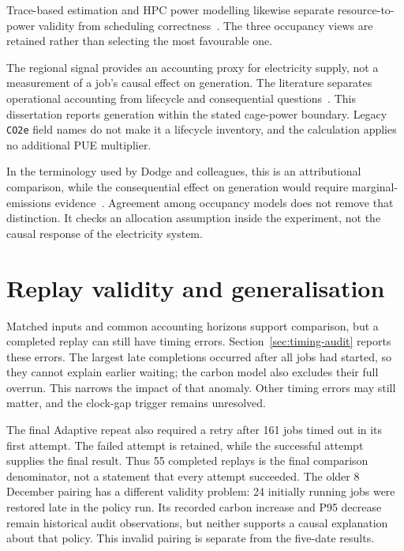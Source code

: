 Trace-based estimation and HPC power modelling likewise separate resource-to-power validity from scheduling correctness~\cite{west2024ichnos,obrien2017survey}. The three occupancy views are retained rather than selecting the most favourable one.

The regional signal provides an accounting proxy for electricity supply, not a measurement of a job's causal effect on generation. The literature separates operational accounting from lifecycle and consequential questions~\cite{lannelongue2021green,gupta2022act,sukprasert2024limitations}. This dissertation reports generation \co{} within the stated cage-power boundary. Legacy \texttt{CO2e} field names do not make it a lifecycle inventory, and the calculation applies no additional PUE multiplier.

In the terminology used by Dodge and colleagues, this is an attributional comparison, while the consequential effect on generation would require marginal-emissions evidence~\cite{dodge2022carbon}. Agreement among occupancy models does not remove that distinction. It checks an allocation assumption inside the experiment, not the causal response of the electricity system.

\section{Replay validity and generalisation}
Matched inputs and common accounting horizons support comparison, but a completed replay can still have timing errors. Section~\ref{sec:timing-audit} reports these errors. The largest late completions occurred after all jobs had started, so they cannot explain earlier waiting; the carbon model also excludes their full overrun. This narrows the impact of that anomaly. Other timing errors may still matter, and the clock-gap trigger remains unresolved.

The final Adaptive repeat also required a retry after 161 jobs timed out in its first attempt. The failed attempt is retained, while the successful attempt supplies the final result. Thus 55 completed replays is the final comparison denominator, not a statement that every attempt succeeded. The older 8 December pairing has a different validity problem: 24 initially running jobs were restored late in the policy run. Its recorded carbon increase and P95 decrease remain historical audit observations, but neither supports a causal explanation about that policy. This invalid pairing is separate from the five-date results.

